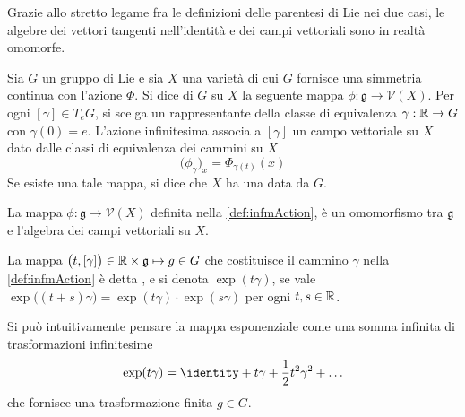 Grazie allo stretto legame fra le definizioni delle parentesi di Lie nei due casi, le algebre dei vettori tangenti nell'identità e dei campi vettoriali sono in realtà omomorfe.

\begin{definition} \label{def:infmAction}
  Sia $G$ un gruppo di Lie e sia $X$ una varietà di cui $G$ fornisce una simmetria continua con l'azione $\Phi$. Si dice  di $G$ su $X$ la seguente mappa $\phi: \mathfrak{g} \to \mathcal{V}(X)$. Per ogni $[\gamma] \in T_e G$, si scelga un rappresentante della classe di equivalenza $\gamma:\mathbb{R}\to G$ con $\gamma(0) = e$. L'azione infinitesima associa a $[\gamma]$ un campo vettoriale su $X$ dato dalle classi di equivalenza dei cammini su $X$
  \begin{equation*}
  \big(\phi_{\gamma}\big)_x = \Phi_{\gamma(t)} (x)
  \end{equation*}
  Se esiste una tale mappa, si dice che $X$ ha una  data da $G$.
\end{definition}
\begin{theorem}
  La mappa $\phi: \mathfrak{g} \to \mathcal{V}(X)$ definita nella \autoref{def:infmAction}, è un omomorfismo tra $\mathfrak{g}$ e l'algebra dei campi vettoriali su $X$.
\end{theorem}
\begin{definition}
  La mappa $\big(t, [\gamma]\big) \in \mathbb{R} \times  \mathfrak{g} \mapsto g \in G$ che costituisce il cammino $\gamma$ nella \autoref{def:infmAction} è detta , e si denota $\exp(t \gamma)$, se vale $\exp\big((t+s) \gamma\big) = \exp(t \gamma) \cdot  \exp (s \gamma)$ per ogni $t,s \in \mathbb{R}$.
\end{definition}
\begin{remark}
  Si può intuitivamente pensare la mappa esponenziale come una somma infinita di trasformazioni infinitesime
  \begin{equation*}
  \exp(t \gamma) = \identity + t \gamma + \frac{1}{2} t^2 \gamma^2 + \ldots
  \end{equation*} 
  che fornisce una trasformazione finita $g \in G$.
\end{remark} 

